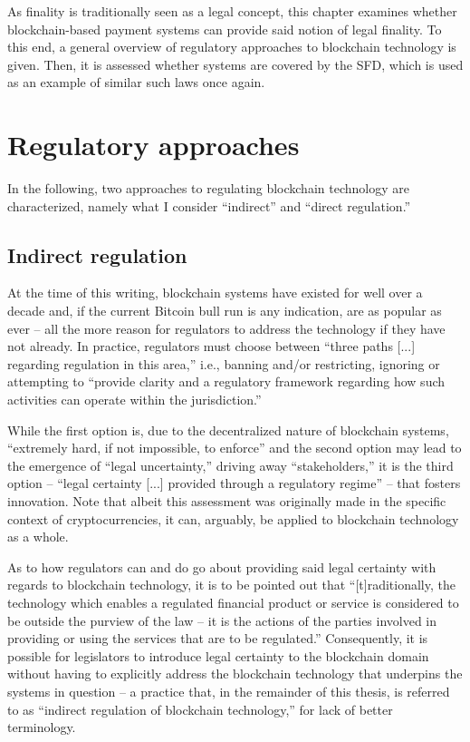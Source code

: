 As finality is traditionally seen as a legal concept, this chapter examines whether blockchain-based payment systems can provide said notion of legal finality.
To this end, a general overview of regulatory approaches to blockchain technology is given.
Then, it is assessed whether systems are covered by the SFD, which is used as an example of similar such laws once again.

\section{Regulatory approaches}

In the following, two approaches to regulating blockchain technology are characterized, namely what I consider ``indirect'' and ``direct regulation.''

\subsection{Indirect regulation}

At the time of this writing, blockchain systems have existed for well over a decade and, if the current Bitcoin bull run \autocite{nytimes2021bitcoinrecord} is any indication, are as popular as ever -- all the more reason for regulators to address the technology if they have not already.
In practice, regulators must choose between ``three paths [...] regarding regulation in this area,'' i.e., banning and/or restricting, ignoring or attempting to ``provide clarity and a regulatory framework regarding how such activities can operate within the jurisdiction.''  \autocite[210]{ellul2020}

While the first option is, due to the decentralized nature of blockchain systems, ``extremely hard, if not impossible, to enforce'' and the second option may lead to the emergence of ``legal uncertainty,'' driving away ``stakeholders,'' it is the third option -- ``legal certainty [...] provided through a regulatory regime'' -- that fosters innovation. \autocite[210]{ellul2020}
Note that albeit this assessment was originally made in the specific context of cryptocurrencies, it can, arguably, be applied to blockchain technology as a whole.

As to how regulators can and do go about providing said legal certainty with regards to blockchain technology, it is to be pointed out that ``[t]raditionally, the technology which enables a regulated financial product or service is considered to be outside the purview of the law -- it is the actions of the parties involved in providing or using the services that are to be regulated.'' \autocite[211]{ellul2020}
Consequently, it is possible for legislators to introduce legal certainty to the blockchain domain without having to explicitly address the blockchain technology that underpins the systems in question -- a practice that, in the remainder of this thesis, is referred to as ``indirect regulation of blockchain technology,'' for lack of better terminology.

